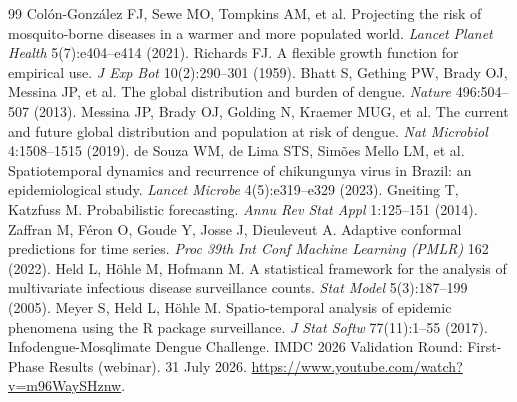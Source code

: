 \documentclass[11pt]{article}
\begin{document}
\begin{thebibliography}{99}
 Col\'on-Gonz\'alez FJ, Sewe MO, Tompkins AM, et al. Projecting the risk of mosquito-borne diseases in a warmer and more populated world. \emph{Lancet Planet Health} 5(7):e404--e414 (2021).
 Richards FJ. A flexible growth function for empirical use. \emph{J Exp Bot} 10(2):290--301 (1959).
 Bhatt S, Gething PW, Brady OJ, Messina JP, et al. The global distribution and burden of dengue. \emph{Nature} 496:504--507 (2013).
 Messina JP, Brady OJ, Golding N, Kraemer MUG, et al. The current and future global distribution and population at risk of dengue. \emph{Nat Microbiol} 4:1508--1515 (2019).
 de Souza WM, de Lima STS, Sim\~oes Mello LM, et al. Spatiotemporal dynamics and recurrence of chikungunya virus in Brazil: an epidemiological study. \emph{Lancet Microbe} 4(5):e319--e329 (2023).
 Gneiting T, Katzfuss M. Probabilistic forecasting. \emph{Annu Rev Stat Appl} 1:125--151 (2014).
 Zaffran M, F\'eron O, Goude Y, Josse J, Dieuleveut A. Adaptive conformal predictions for time series. \emph{Proc 39th Int Conf Machine Learning (PMLR)} 162 (2022).
 Held L, H\"ohle M, Hofmann M. A statistical framework for the analysis of multivariate infectious disease surveillance counts. \emph{Stat Model} 5(3):187--199 (2005).
 Meyer S, Held L, H\"ohle M. Spatio-temporal analysis of epidemic phenomena using the R package surveillance. \emph{J Stat Softw} 77(11):1--55 (2017).
 Infodengue-Mosqlimate Dengue Challenge. IMDC 2026 Validation Round: First-Phase Results (webinar). 31 July 2026. \url{https://www.youtube.com/watch?v=m96WaySHznw}.
\end{thebibliography}
\end{document}
